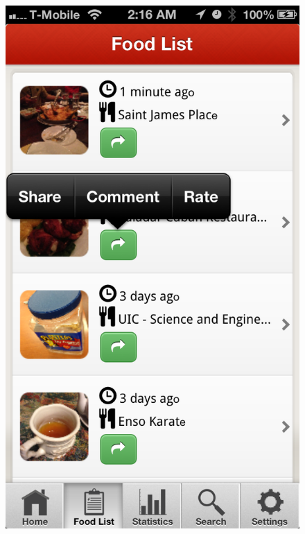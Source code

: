 \begin{figure}
{	\includegraphics[width=\figwidth, totalheight=\figheight, keepaspectratio]{./screenshots/foodlist-menupop.png}} \hfill 
\end{figure}
